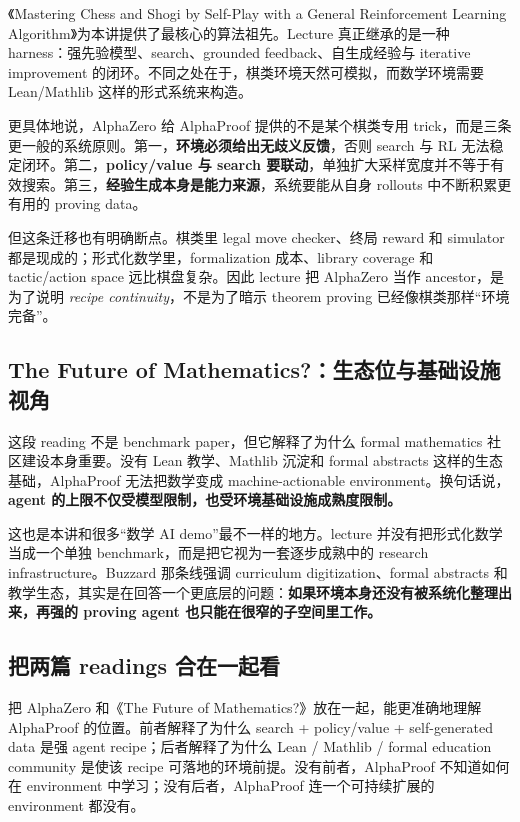 \documentclass[a4paper]{article}
\begin{document}
《Mastering Chess and Shogi by Self-Play with a General Reinforcement Learning Algorithm》为本讲提供了最核心的算法祖先。Lecture 真正继承的是一种 harness：强先验模型、search、grounded feedback、自生成经验与 iterative improvement 的闭环。不同之处在于，棋类环境天然可模拟，而数学环境需要 Lean/Mathlib 这样的形式系统来构造。

更具体地说，AlphaZero 给 AlphaProof 提供的不是某个棋类专用 trick，而是三条更一般的系统原则。第一，\textbf{环境必须给出无歧义反馈}，否则 search 与 RL 无法稳定闭环。第二，\textbf{policy/value 与 search 要联动}，单独扩大采样宽度并不等于有效搜索。第三，\textbf{经验生成本身是能力来源}，系统要能从自身 rollouts 中不断积累更有用的 proving data。

但这条迁移也有明确断点。棋类里 legal move checker、终局 reward 和 simulator 都是现成的；形式化数学里，formalization 成本、library coverage 和 tactic/action space 远比棋盘复杂。因此 lecture 把 AlphaZero 当作 ancestor，是为了说明 \emph{recipe continuity}，不是为了暗示 theorem proving 已经像棋类那样“环境完备”。

\subsection{The Future of Mathematics?：生态位与基础设施视角}

这段 reading 不是 benchmark paper，但它解释了为什么 formal mathematics 社区建设本身重要。没有 Lean 教学、Mathlib 沉淀和 formal abstracts 这样的生态基础，AlphaProof 无法把数学变成 machine-actionable environment。换句话说，\textbf{agent 的上限不仅受模型限制，也受环境基础设施成熟度限制。}

这也是本讲和很多“数学 AI demo”最不一样的地方。lecture 并没有把形式化数学当成一个单独 benchmark，而是把它视为一套逐步成熟中的 research infrastructure。Buzzard 那条线强调 curriculum digitization、formal abstracts 和教学生态，其实是在回答一个更底层的问题：\textbf{如果环境本身还没有被系统化整理出来，再强的 proving agent 也只能在很窄的子空间里工作。}

\subsection{把两篇 readings 合在一起看}

把 AlphaZero 和《The Future of Mathematics?》放在一起，能更准确地理解 AlphaProof 的位置。前者解释了为什么 search + policy/value + self-generated data 是强 agent recipe；后者解释了为什么 Lean / Mathlib / formal education community 是使该 recipe 可落地的环境前提。没有前者，AlphaProof 不知道如何在 environment 中学习；没有后者，AlphaProof 连一个可持续扩展的 environment 都没有。
\end{document}
